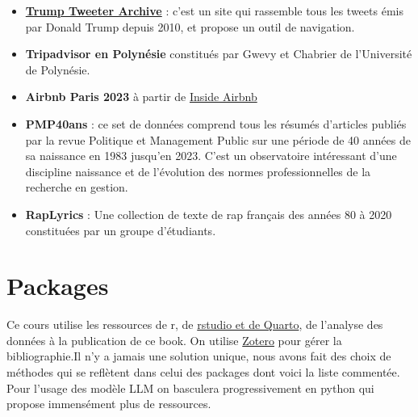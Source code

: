 \documentclass[
  letterpaper,
  DIV=11,
  numbers=noendperiod]{scrreprt}
\begin{document}
\begin{itemize}
\item
  \textbf{\href{https://www.thetrumparchive.com/}{Trump Tweeter
  Archive}} : c'est un site qui rassemble tous les tweets émis par
  Donald Trump depuis 2010, et propose un outil de navigation.
\item
  \textbf{Tripadvisor en Polynésie} constitués par Gwevy et Chabrier de
  l'Université de Polynésie.
\item
  \textbf{Airbnb Paris 2023} à partir de
  \href{https://insideairbnb.com/}{Inside Airbnb}
\item
  \textbf{PMP40ans} : ce set de données comprend tous les résumés
  d'articles publiés par la revue Politique et Management Public sur une
  période de 40 années de sa naissance en 1983 jusqu'en 2023. C'est un
  observatoire intéressant d'une discipline naissance et de l'évolution
  des normes professionnelles de la recherche en gestion.
\item
  \textbf{RapLyrics} : Une collection de texte de rap français des
  années 80 à 2020 constituées par un groupe d'étudiants.
\end{itemize}

\section*{Packages}\label{packages}


Ce cours utilise les ressources de r, de
\href{https://posit.co/}{rstudio et de Quarto}, de l'analyse des données
à la publication de ce book. On utilise
\href{https://www.zotero.org/}{Zotero} pour gérer la bibliographie.Il
n'y a jamais une solution unique, nous avons fait des choix de méthodes
qui se reflètent dans celui des packages dont voici la liste commentée.
Pour l'usage des modèle LLM on basculera progressivement en python qui
propose immensément plus de ressources.
\end{document}
